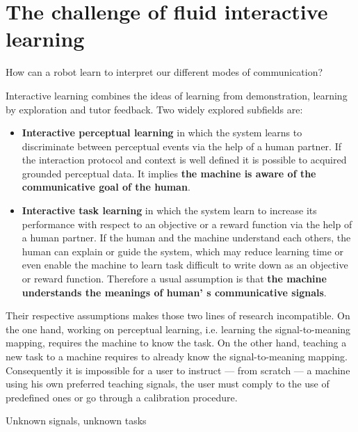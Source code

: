 \section{The challenge of fluid interactive learning}



How can a robot learn to interpret our different modes of communication? 

Interactive learning combines the ideas of learning from demonstration, learning by exploration and tutor feedback. Two widely explored subfields are:
\begin{itemize}
\item \textbf{Interactive perceptual learning} in which the system learns to discriminate between perceptual events via the help of a human partner. If the interaction protocol and context is well defined it is possible to acquired grounded perceptual data. It implies \textbf{the machine is aware of the communicative goal of the human}.
\item \textbf{Interactive task learning} in which the system learn to increase its performance with respect to an objective or a reward function via the help of a human partner. If the human and the machine understand each others, the human can explain or guide the system, which may reduce learning time or even enable the machine to learn task difficult to write down as an objective or reward function. Therefore a usual assumption is that \textbf{the machine understands the meanings of human' s  communicative signals}.
\end{itemize}

Their respective assumptions makes those two lines of research incompatible. On the one hand, working on perceptual learning, i.e. learning the signal-to-meaning mapping, requires the machine to know the task. On the other hand, teaching a new task to a machine requires to already know the signal-to-meaning mapping. Consequently it is impossible for a user to instruct --- from scratch --- a machine using his own preferred teaching signals, the user must comply to the use of predefined ones or go through a calibration procedure.

Unknown signals, unknown tasks

